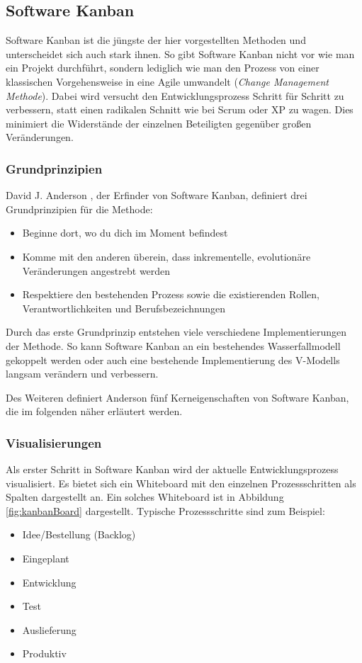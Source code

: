 \subsection{Software Kanban}
Software Kanban ist die jüngste der hier vorgestellten Methoden und unterscheidet sich auch stark ihnen. So gibt Software Kanban nicht vor wie man ein Projekt durchführt, sondern lediglich wie man den Prozess von einer klassischen Vorgehensweise in eine Agile umwandelt (\emph{Change Management Methode}). \cite[S. 14]{bib:wolfRoock} Dabei wird versucht den Entwicklungsprozess Schritt für Schritt zu verbessern, statt einen radikalen Schnitt wie bei Scrum oder XP zu wagen. Dies minimiert die Widerstände der einzelnen Beteiligten gegenüber großen Veränderungen. \cite{bib:ix2011}

\subsubsection{Grundprinzipien}
David J. Anderson \cite{bib:anderson}, der Erfinder von Software Kanban, definiert drei Grundprinzipien für die Methode:
\begin{itemize}
  \item Beginne dort, wo du dich im Moment befindest
  \item Komme mit den anderen überein, dass inkrementelle, evolutionäre Veränderungen angestrebt werden
  \item Respektiere den bestehenden Prozess sowie die existierenden Rollen, Verantwortlichkeiten und Berufsbezeichnungen
\end{itemize}

Durch das erste Grundprinzip entstehen viele verschiedene Implementierungen der Methode. So kann Software Kanban an ein bestehendes Wasserfallmodell gekoppelt werden oder auch eine bestehende Implementierung des V-Modells langsam verändern und verbessern.

Des Weiteren definiert Anderson fünf Kerneigenschaften von Software Kanban, die im folgenden näher erläutert werden.

\subsubsection{Visualisierungen}
Als erster Schritt in Software Kanban wird der aktuelle Entwicklungsprozess visualisiert. Es bietet sich ein Whiteboard mit den einzelnen Prozessschritten als Spalten dargestellt an. Ein solches Whiteboard ist in Abbildung \ref{fig:kanbanBoard} dargestellt. Typische Prozessschritte sind zum Beispiel:
\begin{itemize}
  \item Idee/Bestellung (Backlog)
  \item Eingeplant
  \item Entwicklung
  \item Test
  \item Auslieferung
  \item Produktiv
\end{itemize}

